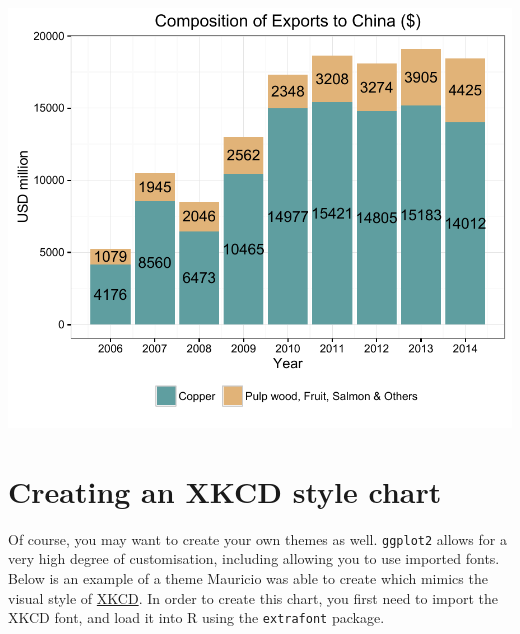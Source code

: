 \begin{center}\includegraphics[width=0.6\linewidth]{3_Bar_Plots_pdf/bar_9-1} \end{center}

\section{Creating an XKCD style
chart}\label{creating-an-xkcd-style-chart}

Of course, you may want to create your own themes as well.
\texttt{ggplot2} allows for a very high degree of customisation,
including allowing you to use imported fonts. Below is an example of a
theme Mauricio was able to create which mimics the visual style of
\href{http://xkcd.com/}{XKCD}. In order to create this chart, you first
need to import the XKCD font, and load it into R using the
\texttt{extrafont} package.

